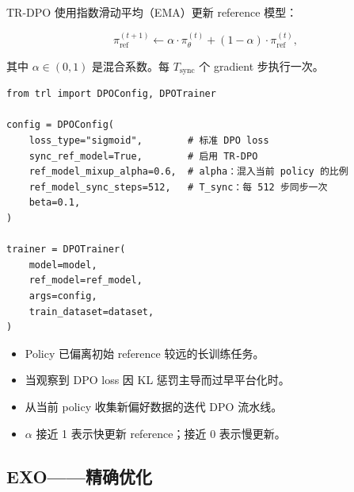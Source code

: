 TR-DPO 使用指数滑动平均（EMA）更新 reference 模型：

\[
\pi_{\text{ref}}^{(t+1)} \leftarrow
    \alpha \cdot \pi_\theta^{(t)} + (1-\alpha) \cdot \pi_{\text{ref}}^{(t)},
\]

其中 $\alpha \in (0,1)$ 是混合系数。每 $T_{\text{sync}}$ 个 gradient 步执行一次。

\begin{examplebox}
\begin{lstlisting}[style=pythonstyle]
from trl import DPOConfig, DPOTrainer

config = DPOConfig(
    loss_type="sigmoid",        # 标准 DPO loss
    sync_ref_model=True,        # 启用 TR-DPO
    ref_model_mixup_alpha=0.6,  # alpha：混入当前 policy 的比例
    ref_model_sync_steps=512,   # T_sync：每 512 步同步一次
    beta=0.1,
)

trainer = DPOTrainer(
    model=model,
    ref_model=ref_model,
    args=config,
    train_dataset=dataset,
)
\end{lstlisting}
\end{examplebox}

\begin{keybox}
\begin{itemize}
  \item Policy 已偏离初始 reference 较远的长训练任务。
  \item 当观察到 DPO loss 因 KL 惩罚主导而过早平台化时。
  \item 从当前 policy 收集新偏好数据的迭代 DPO 流水线。
  \item $\alpha$ 接近 1 表示快更新 reference；接近 0 表示慢更新。
\end{itemize}
\end{keybox}

\subsection{EXO——精确优化}
\label{sec:exo}


